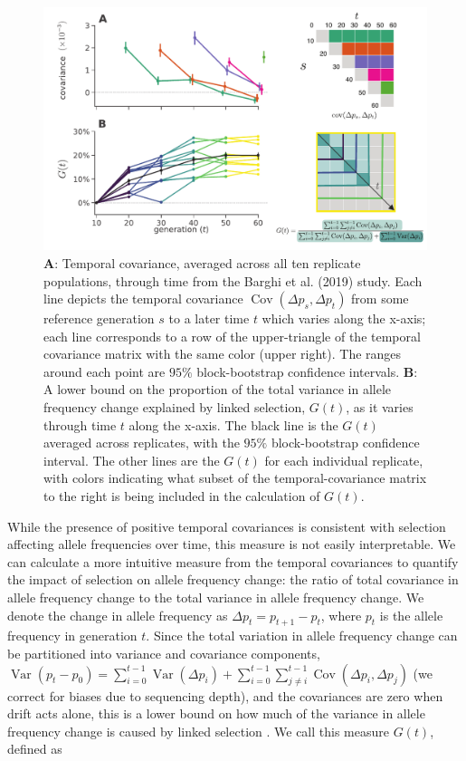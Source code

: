 \documentclass[9pt,twocolumn,twoside]{pnas-new}
\DeclareMathOperator{\var}{Var}
\DeclareMathOperator{\cov}{Cov}
\begin{document}
\begin{figure}
  \centering
  \includegraphics[width=15cm]{figure-1-pnas.pdf}

  \caption{{\bf A}: Temporal covariance, averaged across all ten replicate
    populations, through time from the Barghi et al. (2019) study. Each line
    depicts the temporal covariance $\cov(\Delta p_s, \Delta p_t)$ from some
    reference generation $s$ to a later time $t$ which varies along the x-axis;
    each line corresponds to a row of the upper-triangle of the temporal
    covariance matrix with the same color (upper right). The ranges around each
    point are $95\%$ block-bootstrap confidence intervals. {\bf B}: A lower
    bound on the proportion of the total variance in allele frequency change
    explained by linked selection, $G(t)$, as it varies through time $t$ along
    the x-axis. The black line is the $G(t)$ averaged across replicates, with
    the $95\%$ block-bootstrap confidence interval. The other lines are the
    $G(t)$ for each individual replicate, with colors indicating what subset of
    the temporal-covariance matrix to the right is being included in the
    calculation of $G(t)$.}

  \label{fig:figure-1}
\end{figure}

While the presence of positive temporal covariances is consistent with
selection affecting allele frequencies over time, this measure is not easily
interpretable. We can calculate a more intuitive measure from the temporal
covariances to quantify the impact of selection on allele frequency change: the
ratio of total covariance in allele frequency change to the total variance in
allele frequency change. We denote the change in allele frequency as $\Delta
p_t = p_{t+1}-p_t$, where $p_t$ is the allele frequency in generation $t$.
Since the total variation in allele frequency change can be partitioned into
variance and covariance components, $\var(p_t - p_0) = \sum_{i=0}^{t-1}
\var(\Delta p_i) + \sum_{i=0}^{t-1} \sum_{j \ne i}^{t-1} \cov(\Delta p_i,
\Delta p_j)$ (we correct for biases due to sequencing depth), and the
covariances are zero when drift acts alone, this is a lower bound on how much
of the variance in allele frequency change is caused by linked selection
\cite{Buffalo2019-io}. We call this measure $G(t)$, defined as
\end{document}
